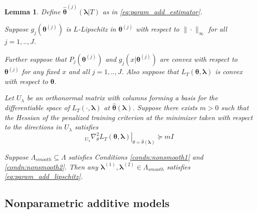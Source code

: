 \documentclass[12pt]{article}
\newtheorem{lemma}{Lemma}
\begin{document}
\begin{lemma}
	\label{lemma:nonsmooth}
	Define $\hat{\boldsymbol{\theta}}^{(j)}\left (\boldsymbol{\lambda} | T\right )$ as in \eqref{eq:param_add_estimator}.
	
	\noindent
	Suppose $g_j(\boldsymbol{\theta}^{(j)})$ is $L$-Lipschitz in $\boldsymbol{\theta}^{(j)}$ with respect to $\| \cdot \|_\infty$ for all $j=1,..,J$.
	
	\noindent		
	Further suppose that $P_j(\boldsymbol{\theta}^{(j)})$ and $g_j(x | \boldsymbol{\theta}^{(j)})$ are convex with respect to $\boldsymbol{\theta}^{(j)}$ for any fixed $x$ and all $j=1,..,J$.  Also suppose that $L_T\left ( \boldsymbol{\theta} , \boldsymbol{\lambda} \right )$ is convex with respect to $\boldsymbol{\theta}$.
	
	Let $U_\lambda$ be an orthonormal matrix with columns forming a basis for the differentiable space of $L_T(\cdot , \boldsymbol{\lambda})$ at $\hat{\boldsymbol{\theta}}(\boldsymbol{\lambda})$. Suppose there exists $m > 0$ such that the Hessian of the penalized training criterion at the minimizer taken with respect to the directions in $U_\lambda$ satisfies 
	\begin{equation}
	\left . _{U_\lambda}\nabla_{\theta}^2 L_T(\boldsymbol{\theta}, \boldsymbol{\lambda}) \right |_{\theta = \hat{\theta}(\boldsymbol{\lambda})} \succeq mI
	\end{equation}		
	
	Suppose $\Lambda_{smooth} \subseteq \Lambda$ satisfies Conditions \ref{condn:nonsmooth1} and \ref{condn:nonsmooth2}. Then any $\boldsymbol{\lambda}^{(1)}, \boldsymbol{\lambda}^{(2)} \in \Lambda_{smooth}$ satisfies  \eqref{eq:param_add_lipschitz}.
\end{lemma}

\subsection{Nonparametric additive models}
\label{sec:nonparam_smooth}
\end{document}

